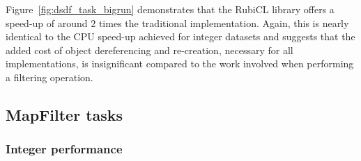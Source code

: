 Figure~\ref{fig:dsdf_task_bigrun} demonstrates that the RubiCL library offers a speed-up of around $2$ times the traditional implementation. Again, this is nearly identical to the \ac{CPU} speed-up achieved for integer datasets and suggests that the added cost of object dereferencing and re-creation, necessary for all implementations, is insignificant compared to the work involved when performing a filtering operation.



\subsection{MapFilter tasks}
\subsubsection{Integer performance}

